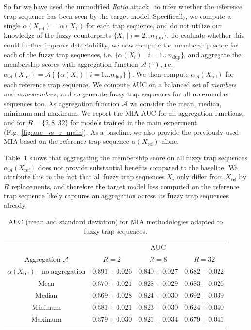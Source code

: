 So far we have used the unmodified \textit{Ratio} attack~\cite{carlini2021extracting} to infer whether the reference trap sequence has been seen by the target model. Specifically, we compute a single $\alpha(X_{\text{ref}}) = \alpha(X_1)$ for each trap sequence, and do not utilize our knowledge of the fuzzy counterparts $\{X_i \mid i=2 \ldots n_{\text{dup}}\}$. To evaluate whether this could further improve detectability, we now compute the membership score for each of the fuzzy trap sequences, i.e. $\{\alpha(X_i) \mid i=1 \ldots n_{\text{dup}}\}$, and aggregate the membership scores with aggregation function $\mathcal{A}(\cdot)$, i.e. $\alpha_{\mathcal{A}}(X_{\text{ref}}) = \mathcal{A}\left( \{\alpha(X_i) \mid i=1 \ldots n_{\text{dup}}\}\right)$. We then compute $\alpha_{\mathcal{A}}(X_{\text{ref}})$ for each reference trap sequence. We compute AUC on a balanced set of \emph{members} and \emph{non-members}, and so generate fuzzy trap sequences for all non-member sequences too. As aggregation function $\mathcal{A}$ we consider the mean, median, minimum and maximum. We report the MIA AUC for all aggregation functions, and for $R=\{2, 8, 32\}$ for models trained in the main experiment (Fig.~\ref{fig:auc_vs_r_main}). As a baseline, we also provide the previously used MIA based on the reference trap sequence $\alpha(X_{\text{ref}})$ alone.

 Table~\ref{tab:custom_MIA} shows that aggregating the membership score on all fuzzy trap sequences $\alpha_{\mathcal{A}}(X_{\text{ref}})$ does not provide substantial benefits compared to the baseline. We attribute this to the fact that all fuzzy trap sequences $X_i$ only differ from $X_{\text{ref}}$ by $R$ replacements, and therefore the target model loss computed on the reference trap sequence likely captures an aggregation across its fuzzy trap sequences already.

\begin{table}[ht]
    \centering
    \begin{tabular}{cccc}
    \toprule
         & \multicolumn{3}{c}{AUC} \\
        Aggregation $\mathcal{A}$ & $R=2$ & $R=8$ & $R=32$ \\
        \midrule
        $\alpha(X_{\text{ref}})$ - no aggregation & $0.891 \pm 0.026$ & $0.840 \pm 0.027$ & $0.682 \pm 0.022$ \\ 
         \midrule
         \midrule
        Mean & $0.870 \pm 0.021$ & $0.828 \pm 0.029$ & $0.683 \pm 0.026$ \\ 
         \cmidrule{1-4}
        Median & $0.869 \pm 0.028$ & $0.824 \pm 0.030$ & $0.692 \pm 0.039$ \\  
         \cmidrule{1-4}
        Minimum & $0.881 \pm 0.021$ & $0.823 \pm 0.030$ & $0.624 \pm 0.040$  \\ 
         \cmidrule{1-4}
        Maximum & $0.879 \pm 0.030$ & $0.821 \pm 0.034$ & $0.679 \pm 0.041$  \\ 
         \bottomrule
    \end{tabular}
    \label{tab:custom_MIA}
    \caption{AUC (mean and standard deviation) for MIA methodologies adapted to fuzzy trap sequences.}
\end{table}



